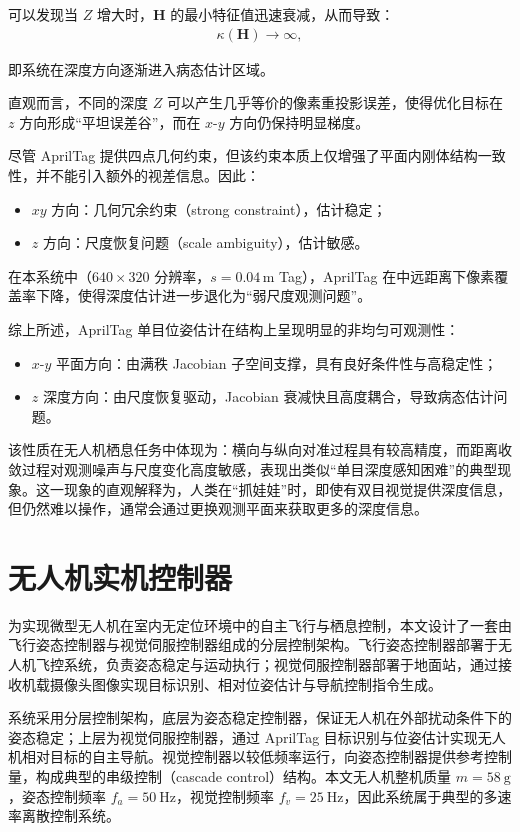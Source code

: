 可以发现当 $Z$ 增大时，$\mathbf{H}$ 的最小特征值迅速衰减，从而导致：
\begin{align}
\kappa(\mathbf{H}) \rightarrow \infty,
\end{align}

即系统在深度方向逐渐进入病态估计区域。

直观而言，不同的深度 $Z$ 可以产生几乎等价的像素重投影误差，使得优化目标在 $z$ 方向形成“平坦误差谷”，而在 $x$-$y$ 方向仍保持明显梯度。

尽管 AprilTag 提供四点几何约束，但该约束本质上仅增强了平面内刚体结构一致性，并不能引入额外的视差信息。因此：

\begin{itemize}
  \item $xy$ 方向：几何冗余约束（strong constraint），估计稳定；
  \item $z$ 方向：尺度恢复问题（scale ambiguity），估计敏感。
\end{itemize}

在本系统中（$640 \times 320$ 分辨率，$s=0.04\,\mathrm{m}$ Tag），AprilTag 在中远距离下像素覆盖率下降，使得深度估计进一步退化为“弱尺度观测问题”。

综上所述，AprilTag 单目位姿估计在结构上呈现明显的非均匀可观测性：

\begin{itemize}
\item $x$-$y$ 平面方向：由满秩 Jacobian 子空间支撑，具有良好条件性与高稳定性；
\item $z$ 深度方向：由尺度恢复驱动，Jacobian 衰减快且高度耦合，导致病态估计问题。
\end{itemize}

该性质在无人机栖息任务中体现为：横向与纵向对准过程具有较高精度，而距离收敛过程对观测噪声与尺度变化高度敏感，表现出类似“单目深度感知困难”的典型现象。这一现象的直观解释为，人类在“抓娃娃”时，即使有双目视觉提供深度信息，但仍然难以操作，通常会通过更换观测平面来获取更多的深度信息。

\section{无人机实机控制器}

为实现微型无人机在室内无定位环境中的自主飞行与栖息控制，本文设计了一套由飞行姿态控制器与视觉伺服控制器组成的分层控制架构。飞行姿态控制器部署于无人机飞控系统，负责姿态稳定与运动执行；视觉伺服控制器部署于地面站，通过接收机载摄像头图像实现目标识别、相对位姿估计与导航控制指令生成。

系统采用分层控制架构，底层为姿态稳定控制器，保证无人机在外部扰动条件下的姿态稳定；上层为视觉伺服控制器，通过 AprilTag 目标识别与位姿估计实现无人机相对目标的自主导航。视觉控制器以较低频率运行，向姿态控制器提供参考控制量，构成典型的串级控制（cascade control）结构。本文无人机整机质量 $m = 58\ \mathrm{g}$，姿态控制频率 $f_a = 50\ \mathrm{Hz}$，视觉控制频率 $f_v = 25\ \mathrm{Hz}$，因此系统属于典型的多速率离散控制系统。

